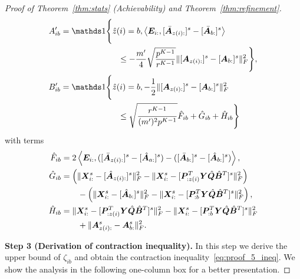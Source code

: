 \documentclass[journal]{IEEEtran}
\theoremstyle{definition}
\theoremstyle{definition}
\newcommand{\of}[1]{\left(#1\right)}
\newcommand{\ang}[1]{\left\langle#1\right\rangle}
\begin{document}
\begin{proof}[Proof of Theorem~\ref{thm:stats} (Achievability) and Theorem~\ref{thm:refinement}]
{    \vspace{-0.5cm}
    \small
    \begin{align}
        A'_{ib} &= \ind \Bigg\{  \hat z(i)  = b,   \ang{\mE_{i:}, [\bar \mA_{z(i):}]^s - [\bar \mA_{b:}]^s }  \\
        & \quad \quad \quad \quad \quad \quad \quad  \leq - \frac{m'}{4}  \sqrt{\frac{p^{K-1}}{r^{K-1}}} \onormSize{}{ [\mA_{z(i):}]^s -  [\mA_{b:}]^s  }_F^2 \Bigg\}, \\
    B'_{ib} &= \ind \Bigg\{ \hat z(i)  = b,     - \frac{1}{2}  \onormSize{}{ [\mA_{z(i):}]^s -  [\mA_{b:}]^s  }_F^2  \\
    & \quad \quad \quad \quad \quad \quad \quad  \leq \sqrt{\frac{r^{K-1}}{(m')^2 p^{K-1}}}  \hat F_{ib} + \hat G_{ib} + \hat H_{ib} \Bigg\}
    \end{align}
    \normalsize
    with terms 
    \begin{align}
    \hat F_{ib} &= 2 \ang{ \mE_{i:}, ([\bar  \mA_{z(i):}]^s - [\hat \mA_{a:}]^s) - ([\bar  \mA_{b:}]^s - [\hat \mA_{b:}]^s) }, \\
    \hat G_{ib}& = \of{ \onormSize{}{\mX_{i:}^s - [\hat \mA_{z(i):}]^s}_F^2 - \onormSize{}{ \mX^s_{i:} - [\mP_{:z(i)}^T \mY \hat \mQ \hat \mB^T ]^s }_F^2  } \\
    & \quad \quad - \of{ \onormSize{}{\mX^s_{i:} - [\hat \mA_{b:}]^s}_F^2 - \onormSize{}{ \mX^s_{i:} - [\mP_{:b}^T \mY \hat \mQ \hat \mB^T]^s }_F^2   }, \\
   \hat  H_{ib}& = \onormSize{}{ \mX^s_{i:} - [\mP_{:z(i)}^T \mY \hat \mQ \hat \mB^T]^s }_F^2 - \onormSize{}{ \mX^s_{i:} - [\mP_{:b}^T \mY \hat \mQ \hat \mB^T]^s }_F^2 \\
   & \quad \quad + \onormSize{}{ \mA^s_{z(i):} -  \mA^s_{b:}  }_F^2.
\end{align}
    
    }
   


    {\bf Step 3 (Derivation of contraction inequality).} In this step we derive the upper bound of $\zeta_{ib}$ and obtain the contraction inequality~\eqref{eq:proof_5_ineq}. We show the analysis in the following one-column box for a better presentation. 


\end{proof}
\end{document}
